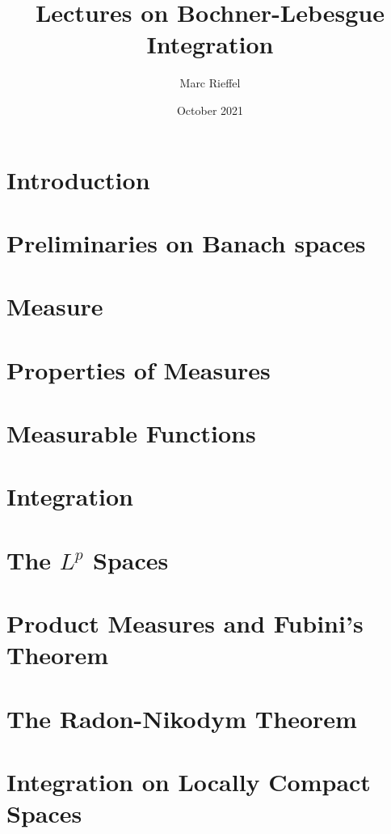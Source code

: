 \documentclass[11pt]{book}
\title{Lectures on Bochner-Lebesgue Integration}
\author{Marc Rieffel}
\date{October 2021}
\theoremstyle{definition}
\begin{document}
\maketitle

\setcounter{chapter}{-1}


\chapter*{Introduction}
%


\tableofcontents

\chapter{Preliminaries on Banach spaces}


\chapter{Measure}


\chapter{Properties of Measures}


\chapter{Measurable Functions}


\chapter{Integration}


\chapter{The $L^p$ Spaces}


\chapter{Product Measures and Fubini's Theorem}


\chapter{The Radon-Nikodym Theorem}
\chapter{Integration on Locally Compact Spaces}
\end{document}
